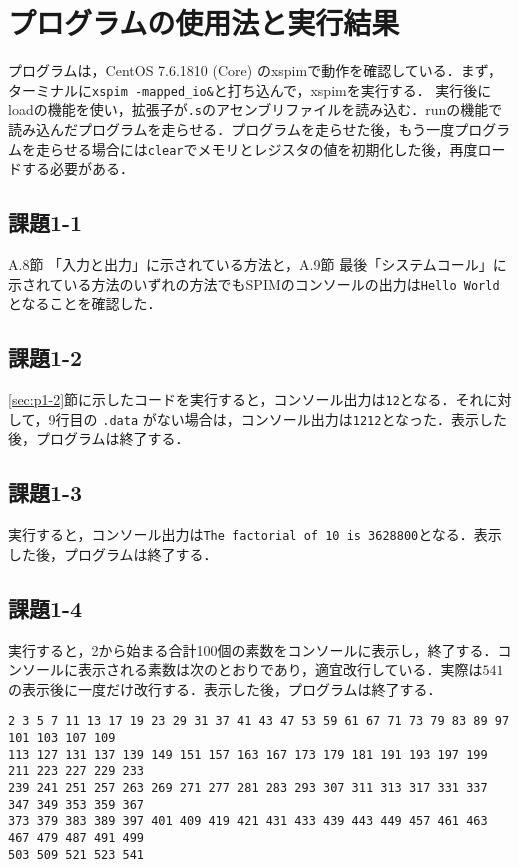 \section{プログラムの使用法と実行結果}\label{sec:howresult}

プログラムは，CentOS 7.6.1810 (Core) のxspimで動作を確認している．まず，ターミナルに\verb|xspim -mapped_io&|と打ち込んで，xspimを実行する．
実行後にloadの機能を使い，拡張子が\verb|.s|のアセンブリファイルを読み込む．runの機能で読み込んだプログラムを走らせる．プログラムを走らせた後，もう一度プログラムを走らせる場合には\verb|clear|でメモリとレジスタの値を初期化した後，再度ロードする必要がある．

\subsection{課題1-1}
A.8節 「入力と出力」に示されている方法と，A.9節 最後「システムコール」に示されている方法のいずれの方法でもSPIMのコンソールの出力は\verb|Hello World|となることを確認した．
\subsection{課題1-2}
\ref{sec:p1-2}節に示したコードを実行すると，コンソール出力は\verb|12|となる．それに対して，9行目の \verb|.data| がない場合は，コンソール出力は\verb|1212|となった．表示した後，プログラムは終了する．

\subsection{課題1-3}
実行すると，コンソール出力は\verb|The factorial of 10 is 3628800|となる．表示した後，プログラムは終了する．

\subsection{課題1-4}
実行すると，2から始まる合計100個の素数をコンソールに表示し，終了する．コンソールに表示される素数は次のとおりであり，適宜改行している．実際は$541$の表示後に一度だけ改行する．表示した後，プログラムは終了する．
\begin{verbatim}
2 3 5 7 11 13 17 19 23 29 31 37 41 43 47 53 59 61 67 71 73 79 83 89 97 101 103 107 109
113 127 131 137 139 149 151 157 163 167 173 179 181 191 193 197 199 211 223 227 229 233
239 241 251 257 263 269 271 277 281 283 293 307 311 313 317 331 337 347 349 353 359 367
373 379 383 389 397 401 409 419 421 431 433 439 443 449 457 461 463 467 479 487 491 499
503 509 521 523 541 
\end{verbatim}

